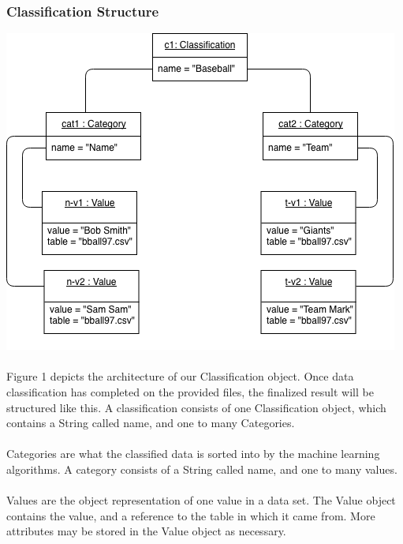 \documentclass[12pt,oneside,letterpaper]{article}
\begin{document}
\subsubsection{Classification Structure}
\includegraphics[scale = 0.9]{spencer_object.png}
\begingroup
{}
\endgroup

\paragraph{} Figure 1 depicts the architecture of our Classification object. Once data classification has completed on the provided files, the finalized result will be structured like this. A classification consists of one Classification object, which contains a String called name, and one to many Categories. 
\paragraph{} Categories are what the classified data is sorted into by the machine learning algorithms. A category consists of a String called name, and one to many values.
\paragraph{} Values are the object representation of one value in a data set. The Value object contains the value, and a reference to the table in which it came from. More attributes may be stored in the Value object as necessary.
\end{document}
